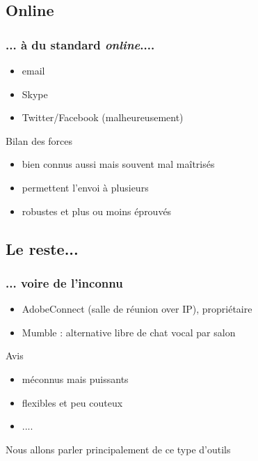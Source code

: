 \documentclass{beamer}
\begin{document}
\subsection{Online} %

\begin{frame}
    \frametitle{... à du standard \textit{online}....} 

    \begin{itemize}
        \item email
        \item Skype
        \item Twitter/Facebook (malheureusement)
    \end{itemize}

    \pause{}

    \begin{block}{Bilan des forces}
        \begin{itemize}
            \item bien connus aussi mais souvent mal maîtrisés
            \item permettent l'envoi à plusieurs
            \item robustes et plus ou moins éprouvés
        \end{itemize}
    \end{block}
\end{frame}

\subsection{Le reste...} %

\begin{frame}
    \frametitle{... voire de l'inconnu}

    \begin{itemize}
        \item AdobeConnect (salle de réunion over IP), propriétaire
        \item Mumble : alternative libre de chat vocal par salon
    \end{itemize}

    \pause{}

    \begin{block}{Avis}
        \begin{itemize}
            \item méconnus mais puissants
            \item flexibles et peu couteux
            \item ....
        \end{itemize}

        \pause{}

        Nous allons parler principalement de ce type d'outils
    \end{block}
\end{frame}
\end{document}
